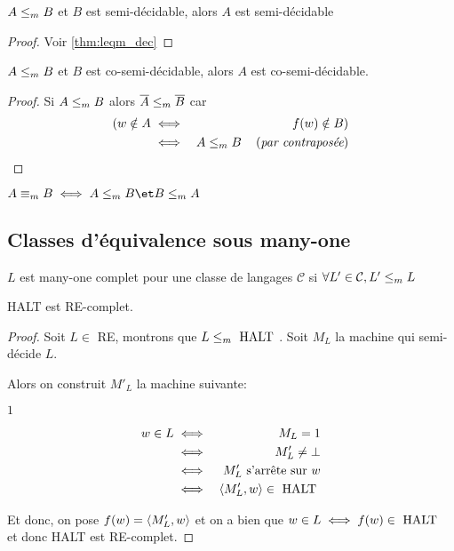 \begin{theorem}\label{thm:leqm_sdec}
	$A \leq_m B$ et $B$ est semi-décidable, alors $A$ est semi-décidable
\end{theorem}

\begin{proof}
	Voir \ref{thm:leqm_dec}
\end{proof}

\begin{theorem}
	$A \leq_m B$ et $B$ est co-semi-décidable, alors $A$ est co-semi-décidable.
\end{theorem}

\begin{proof}
	Si $A \leq_m B$ alors $\overline A \leq_m \overline B$ car
	\begin{eqnarray*}
		(w \notin A &\iff& f(w) \notin B) \\
		&\iff& A \leq_m B \quad\left(\textit{par contraposée}\right)
	\end{eqnarray*}
\end{proof}

\begin{definition}
	$A \equivm B \iff A \leqm B \et B \leqm A$
\end{definition}

\subsection{Classes d'équivalence sous many-one}

\begin{definition}
	$L$ est many-one complet pour une classe de langages $\mathcal C$ si $\forall L' \in \mathcal C, L' \leq_m L$
\end{definition}

\begin{prop}
	HALT est RE-complet.
\end{prop}

\begin{proof}
	Soit $L \in $ RE, montrons que $L \leq_m \text{ HALT }$. Soit $M_L$ la machine qui semi-décide $L$.

	Alors on construit $M'_L$ la machine suivante:
	\begin{algorithmic}[lines]
		 {$1$}
		\Else { $\bot$}
		\EndIf
		\EndFunction
	\end{algorithmic}

	\begin{eqnarray*}
		w \in L &\iff& M_L = 1 \\
		&\iff& M'_L \neq \bot \\
		&\iff& M'_L \text{ s'arrête sur } w\\
		&\iff& \left\langle M'_L,w\right\rangle \in \text{ HALT }
	\end{eqnarray*}

	Et donc, on pose $f (w) = \left\langle M'_L,w\right\rangle$ et on a bien que
	$w \in L \iff f(w) \in \text{ HALT }$ et donc HALT est RE-complet.
\end{proof}

